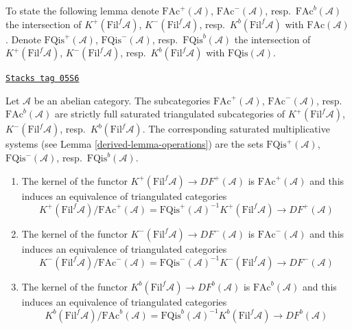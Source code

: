 To state the following lemma denote
$\text{FAc}^{+}(\mathcal{A})$, $\text{FAc}^{-}(\mathcal{A})$,
resp.\ $\text{FAc}^b(\mathcal{A})$ the intersection of
$K^{+}(\text{Fil}^f\mathcal{A})$, $K^{-}(\text{Fil}^f\mathcal{A})$,
resp.\ $K^b(\text{Fil}^f\mathcal{A})$ with $\text{FAc}(\mathcal{A})$.
Denote $\text{FQis}^{+}(\mathcal{A})$, $\text{FQis}^{-}(\mathcal{A})$,
resp.\ $\text{FQis}^b(\mathcal{A})$ the intersection of
$K^{+}(\text{Fil}^f\mathcal{A})$, $K^{-}(\text{Fil}^f\mathcal{A})$,
resp.\ $K^b(\text{Fil}^f\mathcal{A})$ with $\text{FQis}(\mathcal{A})$.

\begin{lemma}
\label{derived-lemma-filtered-bounded-derived}
\href{https://stacks.math.columbia.edu/tag/05S6}{\texttt{Stacks tag 05S6}}

Let $\mathcal{A}$ be an abelian category. The subcategories
$\text{FAc}^{+}(\mathcal{A})$, $\text{FAc}^{-}(\mathcal{A})$,
resp.\ $\text{FAc}^b(\mathcal{A})$
are strictly full saturated triangulated subcategories
of $K^{+}(\text{Fil}^f\mathcal{A})$, $K^{-}(\text{Fil}^f\mathcal{A})$,
resp.\ $K^b(\text{Fil}^f\mathcal{A})$.
The corresponding saturated multiplicative systems (see
Lemma \ref{derived-lemma-operations})
are the sets $\text{FQis}^{+}(\mathcal{A})$, $\text{FQis}^{-}(\mathcal{A})$,
resp.\ $\text{FQis}^b(\mathcal{A})$.
\begin{enumerate}
\item The kernel of the functor
$K^{+}(\text{Fil}^f\mathcal{A}) \to DF^{+}(\mathcal{A})$
is $\text{FAc}^{+}(\mathcal{A})$ and this induces an equivalence
of triangulated categories
$$
K^{+}(\text{Fil}^f\mathcal{A})/\text{FAc}^{+}(\mathcal{A}) =
\text{FQis}^{+}(\mathcal{A})^{-1}K^{+}(\text{Fil}^f\mathcal{A})
\longrightarrow
DF^{+}(\mathcal{A})
$$
\item The kernel of the functor
$K^{-}(\text{Fil}^f\mathcal{A}) \to DF^{-}(\mathcal{A})$
is $\text{FAc}^{-}(\mathcal{A})$ and this induces an equivalence
of triangulated categories
$$
K^{-}(\text{Fil}^f\mathcal{A})/\text{FAc}^{-}(\mathcal{A}) =
\text{FQis}^{-}(\mathcal{A})^{-1}K^{-}(\text{Fil}^f\mathcal{A})
\longrightarrow
DF^{-}(\mathcal{A})
$$
\item The kernel of the functor
$K^b(\text{Fil}^f\mathcal{A}) \to DF^b(\mathcal{A})$
is $\text{FAc}^b(\mathcal{A})$ and this induces an equivalence
of triangulated categories
$$
K^b(\text{Fil}^f\mathcal{A})/\text{FAc}^b(\mathcal{A}) =
\text{FQis}^b(\mathcal{A})^{-1}K^b(\text{Fil}^f\mathcal{A})
\longrightarrow
DF^b(\mathcal{A})
$$
\end{enumerate}
\end{lemma}

